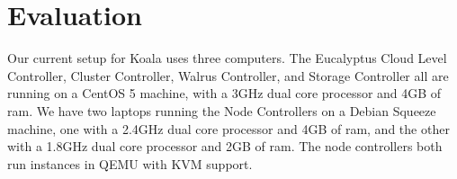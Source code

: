 \section{Evaluation}

Our current setup for Koala uses three computers.  The Eucalyptus Cloud Level Controller, Cluster Controller, Walrus Controller, and Storage Controller all are running on a CentOS 5 machine, with a 3GHz dual core processor and 4GB of ram.  We have two laptops running the Node Controllers on a Debian Squeeze machine, one with a 2.4GHz dual core processor and 4GB of ram, and the other with a 1.8GHz dual core processor and 2GB of ram.  The node controllers both run instances in QEMU with KVM support.  

